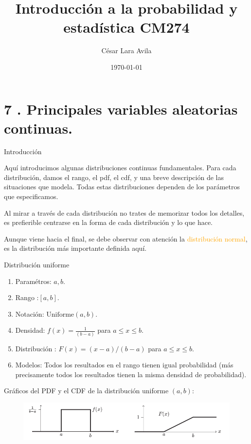 \documentclass[10pt]{beamer}
\title{Introducci\'on a la probabilidad y estad\'istica CM274}
\date{\today}
\author{C\'esar Lara Avila}
\institute{\url{https://github.com/C-Lara}}
\begin{document}
  \maketitle
  \section{7 . Principales variables aleatorias continuas. }
  
\begin{frame}{Introducci\'on}
\small {Aqu\'i introducimos algunas distribuciones continuas fundamentales. Para cada distribuci\'on, damos el rango, el pdf, el cdf, y una breve descripci\'on de las situaciones que modela. Todas estas distribuciones dependen de los par\'ametros que especificamos.
	
Al mirar a trav\'es de cada distribuci\'on no trates de memorizar todos los detalles,  es prefierible centrarse  en la forma de cada distribuci\'on y lo que  hace. 

Aunque viene hacia el final, se debe observar con atenci\'on   la \textcolor{orange}{distribuci\'on normal}, es la distribuci\'on m\'as importante definida aqu\'i.

\vspace{2.5cm}


}
\end{frame}

\begin{frame}{Distribuci\'on uniforme}
\small {
\begin{enumerate}
\item Param\'etros: $a, b$.
\item Rango :$[a,b ]$.
\item Notaci\'on: $\text{Uniforme}(a,b)$.
\item Densidad: $f(x) = \frac{1}{(b -a)}$ para $a \leq x \leq b$.
\item Distribuci\'on : $F(x) = (x -a)/(b -a)$ para $a \leq x \leq b$. 
\item Modelos: Todos los resultados en el rango tienen igual probabilidad (m\'as precisamente todos los resultados tienen la misma densidad de probabilidad).
\end{enumerate}

Gr\'aficos del PDF y el CDF de la distribuci\'on uniforme $(a,b)$:

\begin{figure}[ht]
	\centering
	\includegraphics[scale=.35]{R1.png}
\end{figure}		
}
\end{frame}
\end{document}
